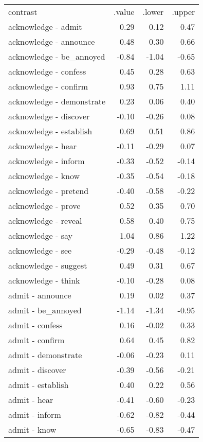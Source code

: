 \begin{longtable}{lrrr}
 contrast & .value & .lower & .upper \\ 
 acknowledge - admit & 0.29 & 0.12 & 0.47 \\ 
  acknowledge - announce & 0.48 & 0.30 & 0.66 \\ 
  acknowledge - be_annoyed & -0.84 & -1.04 & -0.65 \\ 
  acknowledge - confess & 0.45 & 0.28 & 0.63 \\ 
  acknowledge - confirm & 0.93 & 0.75 & 1.11 \\ 
  acknowledge - demonstrate & 0.23 & 0.06 & 0.40 \\ 
  acknowledge - discover & -0.10 & -0.26 & 0.08 \\ 
  acknowledge - establish & 0.69 & 0.51 & 0.86 \\ 
  acknowledge - hear & -0.11 & -0.29 & 0.07 \\ 
  acknowledge - inform & -0.33 & -0.52 & -0.14 \\ 
  acknowledge - know & -0.35 & -0.54 & -0.18 \\ 
  acknowledge - pretend & -0.40 & -0.58 & -0.22 \\ 
  acknowledge - prove & 0.52 & 0.35 & 0.70 \\ 
  acknowledge - reveal & 0.58 & 0.40 & 0.75 \\ 
  acknowledge - say & 1.04 & 0.86 & 1.22 \\ 
  acknowledge - see & -0.29 & -0.48 & -0.12 \\ 
  acknowledge - suggest & 0.49 & 0.31 & 0.67 \\ 
  acknowledge - think & -0.10 & -0.28 & 0.08 \\ 
  admit - announce & 0.19 & 0.02 & 0.37 \\ 
  admit - be_annoyed & -1.14 & -1.34 & -0.95 \\ 
  admit - confess & 0.16 & -0.02 & 0.33 \\ 
  admit - confirm & 0.64 & 0.45 & 0.82 \\ 
  admit - demonstrate & -0.06 & -0.23 & 0.11 \\ 
  admit - discover & -0.39 & -0.56 & -0.21 \\ 
  admit - establish & 0.40 & 0.22 & 0.56 \\ 
  admit - hear & -0.41 & -0.60 & -0.23 \\ 
  admit - inform & -0.62 & -0.82 & -0.44 \\ 
  admit - know & -0.65 & -0.83 & -0.47 \\ 

\end{longtable}
